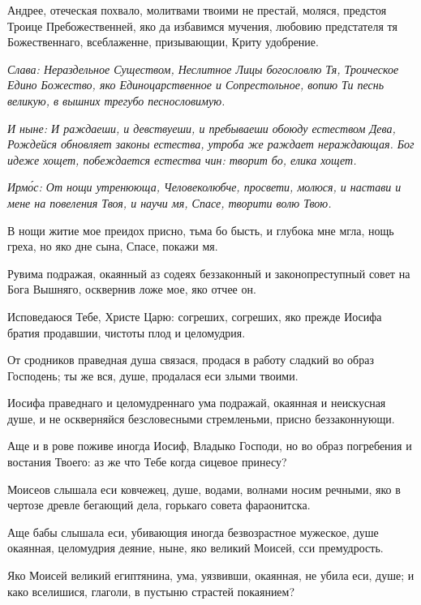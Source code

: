 
Андрее, отеческая похвало, молитвами твоими не престай, моляся, предстоя Троице Пребожественней, яко да избавимся мучения, любовию предстателя тя Божественнаго, всеблаженне, призывающии, Криту удобрение.

\itshape Слава\normalfont{}: Нераздельное Существом, Неслитное Лицы богословлю Тя, Троическое Едино Божество, яко Единоцарственное и Сопрестольное, вопию Ти песнь великую, в вышних трегубо песнословимую.

\itshape И ныне\normalfont{}: И раждаеши, и девствуеши, и пребываеши обоюду естеством Дева, Рождейся обновляет законы естества, утроба же раждает нераждающая. Бог идеже хощет, побеждается естества чин: творит бо, елика хощет. 


\itshape Ирм\'{о}с\normalfont{}: От нощи утренююща, Человеколюбче, просвети, молюся, и настави и мене на повеления Твоя, и научи мя, Спасе, творити волю Твою.

В нощи житие мое преидох присно, тьма бо бысть, и глубока мне мгла, нощь греха, но яко дне сына, Спасе, покажи мя.

Рувима подражая, окаянный аз содеях беззаконный и законопреступный совет на Бога Вышняго, осквернив ложе мое, яко отчее он.

Исповедаюся Тебе, Христе Царю: согреших, согреших, яко прежде Иосифа братия продавшии, чистоты плод и целомудрия.

От сродников праведная душа связася, продася в работу сладкий во образ Господень; ты же вся, душе, продалася еси злыми твоими.

Иосифа праведнаго и целомудреннаго ума подражай, окаянная и неискусная душе, и не оскверняйся безсловесными стремленьми, присно беззаконнующи.

Аще и в рове поживе иногда Иосиф, Владыко Господи, но во образ погребения и востания Твоего: аз же что Тебе когда сицевое принесу?

Моисеов слышала еси ковчежец, душе, водами, волнами носим речными, яко в чертозе древле бегающий дела, горькаго совета фараонитска.

Аще бабы слышала еси, убивающия иногда безвозрастное мужеское, душе окаянная, целомудрия деяние, ныне, яко великий Моисей, сси премудрость.

Яко Моисей великий египтянина, ума, уязвивши, окаянная, не убила еси, душе; и како вселишися, глаголи, в пустыню страстей покаянием?

